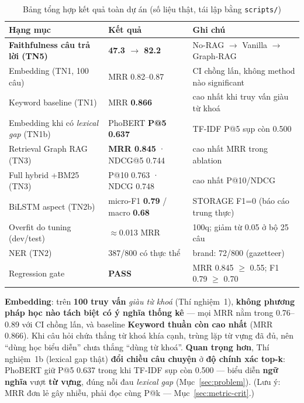 \documentclass[12pt,a4paper]{article}
\begin{document}
\begin{table}[H]
\centering
\caption{Bảng tổng hợp kết quả toàn dự án (số liệu thật, tái lập bằng \texttt{scripts/})}
\renewcommand{\arraystretch}{1.25}
\begin{tabular}{p{5.2cm}p{3cm}p{4.2cm}}
\toprule
\textbf{Hạng mục} & \textbf{Kết quả} & \textbf{Ghi chú} \\
\midrule
\textbf{Faithfulness câu trả lời (TN5)} & \textbf{47.3 $\to$ 82.2} & No-RAG $\to$ Vanilla $\to$ Graph-RAG \\
Embedding (TN1, 100 câu) & MRR 0.82--0.87 & CI chồng lấn, không method nào significant \\
Keyword baseline (TN1) & MRR \textbf{0.866} & cao nhất khi truy vấn giàu từ khoá \\
Embedding khi có \textit{lexical gap} (TN1b) & PhoBERT \textbf{P@5 0.637} & TF-IDF P@5 sụp còn 0.500 \\
Retrieval Graph RAG (TN3) & \textbf{MRR 0.845} · NDCG@5 0.744 & cao nhất MRR trong ablation \\
Full hybrid +BM25 (TN3) & P@10 0.763 · NDCG 0.748 & cao nhất P@10/NDCG \\
BiLSTM aspect (TN2b) & micro-F1 \textbf{0.79} / macro \textbf{0.68} & STORAGE F1=0 (báo cáo trung thực) \\
Overfit do tuning (dev/test) & $\approx$0.013 MRR & 100q; giảm từ 0.05 ở bộ 25 câu \\
NER (TN2) & 387/800 có thực thể & brand: 72/800 (gazetteer) \\
\midrule
Regression gate & \textbf{PASS} & MRR 0.845 $\geq$ 0.55; F1 0.79 $\geq$ 0.70 \\
\bottomrule
\end{tabular}
\end{table}

\textbf{Embedding}: trên \textbf{100 truy vấn} \textit{giàu từ khoá} (Thí nghiệm~1), \textbf{không phương pháp học nào tách biệt có ý nghĩa thống kê} --- mọi MRR nằm trong 0.76--0.89 với CI chồng lấn, và baseline \textbf{Keyword thuần còn cao nhất} (MRR 0.866). Khi câu hỏi chứa thẳng từ khoá khía cạnh, trùng lặp từ vựng đã đủ, nên ``dùng học biểu diễn'' chưa thắng ``dùng từ khoá''. \textbf{Quan trọng hơn}, Thí nghiệm~1b (lexical gap thật) \textbf{đổi chiều câu chuyện} ở \textbf{độ chính xác top-k}: PhoBERT giữ P@5 0.637 trong khi TF-IDF sụp còn 0.500 --- biểu diễn \textbf{ngữ nghĩa} vượt \textbf{từ vựng}, đúng nỗi đau \textit{lexical gap} (Mục~\ref{sec:problem}). (Lưu ý: MRR đơn lẻ gây nhiễu, phải đọc cùng P@k --- Mục~\ref{sec:metric-crit}.)
\end{document}

